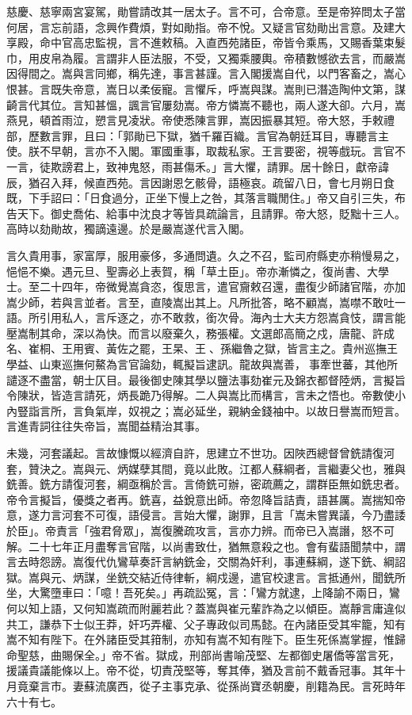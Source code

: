 \begin{pinyinscope}
慈慶、慈寧兩宮宴駕，勛嘗請改其一居太子。言不可，合帝意。至是帝猝問太子當何居，言忘前語，念興作費煩，對如勛指。帝不悅。又疑言官劾勛出言意。及建大享殿，命中官高忠監視，言不進敕稿。入直西苑諸臣，帝皆令乘馬，又賜香葉束髮巾，用皮帛為履。言謂非人臣法服，不受，又獨乘腰輿。帝積數憾欲去言，而嚴嵩因得間之。嵩與言同鄉，稱先達，事言甚謹。言入閣援嵩自代，以門客畜之，嵩心恨甚。言既失帝意，嵩日以柔佞寵。言懼斥，呼嵩與謀。嵩則已潛造陶仲文第，謀齮言代其位。言知甚慍，諷言官屢劾嵩。帝方憐嵩不聽也，兩人遂大卻。六月，嵩燕見，頓首雨泣，愬言見凌狀。帝使悉陳言罪，嵩因振暴其短。帝大怒，手敕禮部，歷數言罪，且曰：「郭勛已下獄，猶千羅百織。言官為朝廷耳目，專聽言主使。朕不早朝，言亦不入閣。軍國重事，取裁私家。王言要密，視等戲玩。言官不一言，徒欺謗君上，致神鬼怒，雨甚傷禾。」言大懼，請罪。居十餘日，獻帝諱辰，猶召入拜，候直西苑。言因謝恩乞骸骨，語極哀。疏留八日，會七月朔日食既，下手詔曰：「日食過分，正坐下慢上之咎，其落言職閒住。」帝又自引三失，布告天下。御史喬佑、給事中沈良才等皆具疏論言，且請罪。帝大怒，貶黜十三人。高時以劾勛故，獨謫遠邊。於是嚴嵩遂代言入閣。

言久貴用事，家富厚，服用豪侈，多通問遺。久之不召，監司府縣吏亦稍慢易之，悒悒不樂。遇元旦、聖壽必上表賀，稱「草土臣」。帝亦漸憐之，復尚書、大學士。至二十四年，帝微覺嵩貪恣，復思言，遣官齎敕召還，盡復少師諸官階，亦加嵩少師，若與言並者。言至，直陵嵩出其上。凡所批答，略不顧嵩，嵩噤不敢吐一語。所引用私人，言斥逐之，亦不敢救，銜次骨。海內士大夫方怨嵩貪忮，謂言能壓嵩制其命，深以為快。而言以廢棄久，務張權。文選郎高簡之戍，唐龍、許成名、崔桐、王用賓、黃佐之罷，王杲、王、孫繼魯之獄，皆言主之。貴州巡撫王學益、山東巡撫何鰲為言官論劾，輒擬旨逮訊。龍故與嵩善，事牽世蕃，其他所譴逐不盡當，朝士仄目。最後御史陳其學以鹽法事劾崔元及錦衣都督陸炳，言擬旨令陳狀，皆造言請死，炳長跪乃得解。二人與嵩比而構言，言未之悟也。帝數使小內豎詣言所，言負氣岸，奴視之；嵩必延坐，親納金錢袖中。以故日譽嵩而短言。言進青詞往往失帝旨，嵩聞益精治其事。

未幾，河套議起。言故慷慨以經濟自許，思建立不世功。因陜西總督曾銑請復河套，贊決之。嵩與元、炳媒孽其間，竟以此敗。江都人蘇綱者，言繼妻父也，雅與銑善。銑方請復河套，綱亟稱於言。言倚銑可辦，密疏薦之，謂群臣無如銑忠者。帝令言擬旨，優獎之者再。銑喜，益銳意出師。帝忽降旨詰責，語甚厲。嵩揣知帝意，遂力言河套不可復，語侵言。言始大懼，謝罪，且言「嵩未嘗異議，今乃盡諉於臣」。帝責言「強君脅眾」，嵩復騰疏攻言，言亦力辨。而帝已入嵩譖，怒不可解。二十七年正月盡奪言官階，以尚書致仕，猶無意殺之也。會有蜚語聞禁中，謂言去時怨謗。嵩復代仇鸞草奏訐言納銑金，交關為奸利，事連蘇綱，遂下銑、綱詔獄。嵩與元、炳謀，坐銑交結近侍律斬，綱戍邊，遣官校逮言。言抵通州，聞銑所坐，大驚墮車曰：「噫！吾死矣。」再疏訟冤，言：「鸞方就逮，上降諭不兩日，鸞何以知上語，又何知嵩疏而附麗若此？蓋嵩與崔元輩詐為之以傾臣。嵩靜言庸違似共工，謙恭下士似王莽，奸巧弄權、父子專政似司馬懿。在內諸臣受其牢籠，知有嵩不知有陛下。在外諸臣受其箝制，亦知有嵩不知有陛下。臣生死係嵩掌握，惟歸命聖慈，曲賜保全。」帝不省。獄成，刑部尚書喻茂堅、左都御史屠僑等當言死，援議貴議能條以上。帝不從，切責茂堅等，奪其俸，猶及言前不戴香冠事。其年十月竟棄言市。妻蘇流廣西，從子主事克承、從孫尚寶丞朝慶，削籍為民。言死時年六十有七。


\end{pinyinscope}
